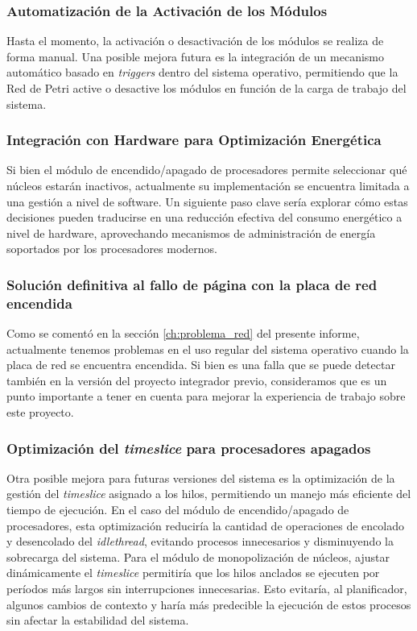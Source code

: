 \subsubsection{Automatización de la Activación de los Módulos}
Hasta el momento, la activación o desactivación de los módulos se realiza de forma manual. Una posible mejora futura es la integración de un mecanismo automático basado en \textit{triggers} dentro del sistema operativo, permitiendo que la Red de Petri active o desactive los módulos en función de la carga de trabajo del sistema.

\subsubsection{Integración con Hardware para Optimización Energética}
Si bien el módulo de encendido/apagado de procesadores permite seleccionar qué núcleos estarán inactivos, actualmente su implementación se encuentra limitada a una gestión a nivel de software. Un siguiente paso clave sería explorar cómo estas decisiones pueden traducirse en una reducción efectiva del consumo energético a nivel de hardware, aprovechando mecanismos de administración de energía soportados por los procesadores modernos.

\subsubsection{Solución definitiva al fallo de página con la placa de red encendida}
Como se comentó en la sección \ref{ch:problema_red} del presente informe, actualmente tenemos problemas en el uso regular del sistema operativo cuando la placa de red se encuentra encendida. Si bien es una falla que se puede detectar también en la versión del proyecto integrador previo, consideramos que es un punto importante a tener en cuenta para mejorar la experiencia de trabajo sobre este proyecto.\par

\subsubsection{Optimización del \textit{timeslice} para procesadores apagados}
Otra posible mejora para futuras versiones del sistema es la optimización de la gestión del \textit{timeslice} asignado a los hilos, permitiendo un manejo más eficiente del tiempo de ejecución. En el caso del módulo de encendido/apagado de procesadores, esta optimización reduciría la cantidad de operaciones de encolado y desencolado del \textit{idlethread}, evitando procesos innecesarios y disminuyendo la sobrecarga del sistema. Para el módulo de monopolización de núcleos, ajustar dinámicamente el \textit{timeslice} permitiría que los hilos anclados se ejecuten por períodos más largos sin interrupciones innecesarias. Esto evitaría, al planificador, algunos cambios de contexto y haría más predecible la ejecución de estos procesos sin afectar la estabilidad del sistema.

